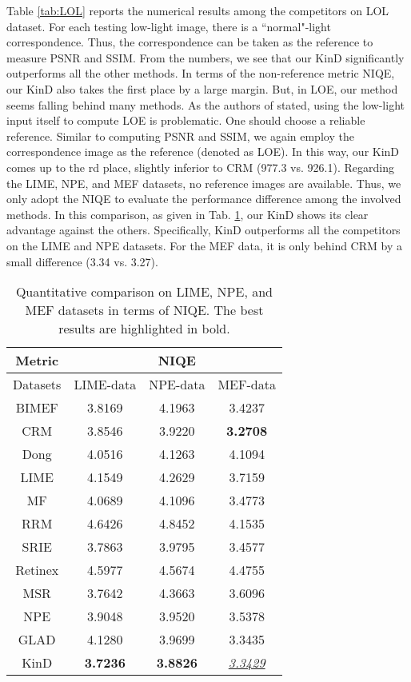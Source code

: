 \documentclass[journal,10pt,compsoc]{IEEEtran}
\begin{document}
Table \ref{tab:LOL} reports the numerical results among the competitors on LOL dataset. For each testing low-light image, there is a ``normal"-light correspondence. Thus, the correspondence can be taken as the reference to measure PSNR and SSIM. From the numbers, we see that our KinD significantly outperforms all the other methods. In terms of the non-reference metric NIQE, our KinD also takes the first place by a large margin. But, in LOE, our method seems falling behind many methods. As the authors of \cite{LIME} stated, using the low-light input itself to compute LOE is problematic. One should choose a reliable reference. Similar to computing PSNR and SSIM, we again employ the correspondence image as the reference (denoted as LOE). In this way, our KinD comes up to the rd place, slightly inferior to CRM (977.3 vs. 926.1).  
Regarding the LIME, NPE, and MEF datasets, no reference images are available. Thus, we only adopt the NIQE to evaluate the performance difference among the involved methods. In this comparison, as given in Tab. \ref{tab:other}, our KinD shows its clear advantage against the others. Specifically, KinD outperforms all the competitors on the LIME and NPE datasets. For the MEF data, it is only behind CRM by a small difference (3.34 vs. 3.27). 

\begin{table}[t]
	\centering
\begin{tabular}{c|ccc}
		\hline
		Metric   &   &  NIQE  &   \\
		\hline
		Datasets& LIME-data &NPE-data & MEF-data  \\ 
		\hline
		BIMEF \cite{BIMEF}    & 3.8169  & 4.1963  & 3.4237  \\
		CRM \cite{CRM}     & 3.8546  & 3.9220  & \textbf{3.2708} \\
		Dong \cite{Dong}     & 4.0516  & 4.1263  & 4.1094 \\
		LIME \cite{LIME}    & 4.1549  & 4.2629  & 3.7159 \\
		MF \cite{MF}       & 4.0689  & 4.1096  & 3.4773  \\ 
		RRM \cite{RRM}     & 4.6426  & 4.8452  & 4.1535  \\ 
		SRIE \cite{SRIE}    & 3.7863  & 3.9795  & 3.4577  \\ 
		Retinex \cite{DRD}    & 4.5977  & 4.5674  & 4.4755  \\ 
		MSR \cite{MSR}     & 3.7642  & 4.3663  & 3.6096  \\ 
		NPE \cite{NPE}      & 3.9048  & 3.9520  & 3.5378  \\ 
		GLAD \cite{GLAD}   & 4.1280  & 3.9699  & 3.3435  \\ 
		KinD     & \textbf{3.7236}  & \textbf{3.8826}  & \underline{\textit{3.3429}}  \\ 
		
		\hline
	\end{tabular}
\caption{Quantitative comparison on LIME, NPE, and MEF datasets in terms of NIQE. The best results are highlighted in bold.}
	\label{tab:other}
	\vspace{-10pt}
\end{table} 
\end{document}
